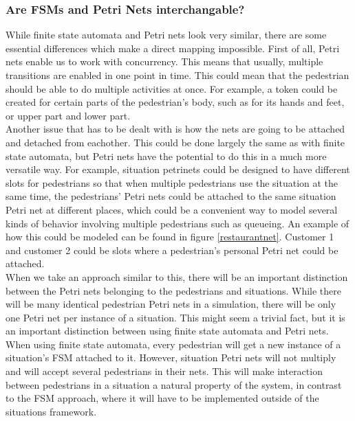 \documentclass[11pt]{book}
\begin{document}
\subsubsection{Are FSMs and Petri Nets interchangable?}
While finite state automata and Petri nets look very similar, there are some essential differences which make a direct mapping impossible. First of all, Petri nets enable us to work with concurrency. This means that usually, multiple transitions are enabled in one point in time. This could mean that the pedestrian should be able to do multiple activities at once. For example, a token could be created for certain parts of the pedestrian's body, such as for its hands and feet, or upper part and lower part.\\
Another issue that has to be dealt with is how the nets are going to be attached and detached from eachother. This could be done largely the same as with finite state automata, but Petri nets have the potential to do this in a much more versatile way. For example, situation petrinets could be designed to have different slots for pedestrians so that when multiple pedestrians use the situation at the same time, the pedestrians' Petri nets could be attached to the same situation Petri net at different places, which could be a convenient way to model several kinds of behavior involving multiple pedestrians such as queueing. An example of how this could be modeled can be found in figure \ref{restaurantnet}.
Customer 1 and customer 2 could be slots where a pedestrian's personal Petri net could be attached. \\
When we take an approach similar to this, there will be an important distinction between the Petri nets belonging to the pedestrians and situations. While there will be many identical pedestrian Petri nets in a simulation, there will be only one Petri net per instance of a situation. This might seem a trivial fact, but it is an important distinction between using finite state automata and Petri nets. When using finite state automata, every pedestrian will get a new instance of a situation's FSM attached to it. However, situation Petri nets will not multiply and will accept several pedestrians in their nets. This will make interaction between pedestrians in a situation a natural property of the system, in contrast to the FSM approach, where it will have to be implemented outside of the situations framework.
\end{document}
